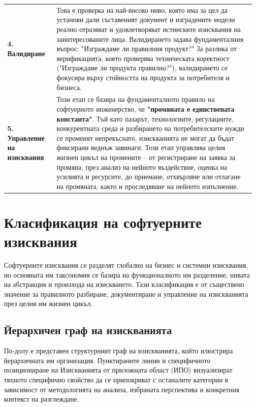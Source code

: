 \documentclass{scrartcl}
\begin{document}
\begin{FlushLeft}
\begin{table}[H]
\begin{tabularx}{\textwidth}{p{2.4cm} X}
\textbf{4. Валидиране} & Това е проверка на най-високо ниво, която има за цел да установи дали съставеният документ и изградените модели реално отразяват и удовлетворяват истинските изисквания на заинтересованите лица. Валидирането задава фундаменталния въпрос: "Изграждаме ли правилния продукт?" За разлика от верификацията, която проверява техническата коректност ("Изграждаме ли продукта правилно?"), валидирането се фокусира върху стойността на продукта за потребителя и бизнеса. \\ \addlinespace
\textbf{5. Управление на изисквания} & Този етап се базира на фундаменталното правило на софтуерното инженерство, че \textbf{"промяната е единствената константа"}. Тъй като пазарът, технологиите, регулациите, конкурентната среда и разбирането на потребителските нужди се променят непрекъснато, изискванията не могат да бъдат фиксирани веднъж завинаги. 
Този етап управлява целия жизнен цикъл на промените -- от регистриране на заявка за промяна, през анализ на нейното въздействие, оценка на усилията и ресурсите, до приемане, отхвърляне или отлагане на промяната, както и проследяване на нейното изпълнение. \\
\bottomrule
\end{tabularx}
\end{table}

\section{Класификация на софтуерните изисквания}

Софтуерните изисквания се разделят глобално на бизнес и системни изисквания, но основната им таксономия се базира на функционалното им разделение, нивата на абстракция и произхода на изискването. Тази класификация е от съществено значение за правилното разбиране, документиране и управление на изискванията през целия им жизнен цикъл.

\subsection{Йерархичен граф на изискванията}

По-долу е представен структурният граф на изискванията, който илюстрира йерархичната им организация. Пунктираните линии и специфичното позициониране на Изискванията от приложната област (ИПО) визуализират тяхното специфично свойство да се припокриват с останалите категории в зависимост от методологията на анализа, избраната перспектива и конкретния контекст на разглеждане.


\end{FlushLeft}
\end{document}
